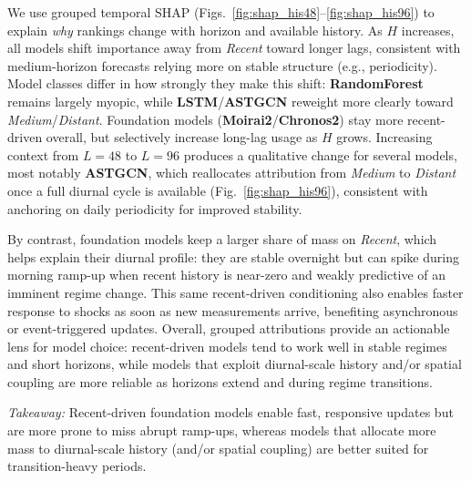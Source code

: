 \documentclass[10pt]{article}
\begin{document}
We use grouped temporal SHAP (Figs.~\ref{fig:shap_his48}--\ref{fig:shap_his96}) to explain \emph{why} rankings
change with horizon and available history. As $H$ increases, all models shift importance away from \textit{Recent}
toward longer lags, consistent with medium-horizon forecasts relying more on stable structure (e.g., periodicity).
Model classes differ in how strongly they make this shift: \textbf{RandomForest} remains largely myopic, while
\textbf{LSTM}/\textbf{ASTGCN} reweight more clearly toward \textit{Medium}/\textit{Distant}. Foundation models
(\textbf{Moirai2}/\textbf{Chronos2}) stay more recent-driven overall, but selectively increase long-lag usage as
$H$ grows.
Increasing context from $L{=}48$ to $L{=}96$ produces a qualitative change for several models, most notably
\textbf{ASTGCN}, which reallocates attribution from \textit{Medium} to \textit{Distant} once a full diurnal cycle is
available (Fig.~\ref{fig:shap_his96}), consistent with anchoring on daily periodicity for improved stability.

By contrast, foundation models keep a larger share of mass on \textit{Recent}, which helps explain their diurnal
profile: they are stable overnight but can spike during morning ramp-up when recent history is near-zero and
weakly predictive of an imminent regime change. This same recent-driven conditioning also enables faster response
to shocks as soon as new measurements arrive, benefiting asynchronous or event-triggered updates. Overall,
grouped attributions provide an actionable lens for model choice: recent-driven models tend to work well in stable
regimes and short horizons, while models that exploit diurnal-scale history and/or spatial coupling are more
reliable as horizons extend and during regime transitions.
\begin{keydiscovery1}
    \textit{Takeaway:}
Recent-driven foundation models enable fast, responsive
updates but are more prone to miss abrupt ramp-ups, whereas models that allocate more mass to diurnal-scale history
(and/or spatial coupling) are better suited for transition-heavy periods.
\end{keydiscovery1}
\end{document}
